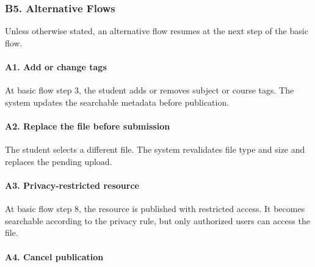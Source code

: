 \documentclass[12pt]{article}
\begin{document}
\hypertarget{sec:b5-alternative-flows}{}
\subsubsection*{B5. Alternative Flows}
\par\medskip

Unless otherwise stated, an alternative flow resumes at the next step of the basic flow.
\par\medskip

\hypertarget{sec:a1-add-or-change-tags}{}
\paragraph*{A1. Add or change tags}
\par\medskip

At basic flow step 3, the student adds or removes subject or course tags. The system updates the searchable metadata before publication.
\par\medskip

\hypertarget{sec:a2-replace-the-file-before-submission}{}
\paragraph*{A2. Replace the file before submission}
\par\medskip

The student selects a different file. The system revalidates file type and size and replaces the pending upload.
\par\medskip

\hypertarget{sec:a3-privacy-restricted-resource}{}
\paragraph*{A3. Privacy-restricted resource}
\par\medskip

At basic flow step 8, the resource is published with restricted access. It becomes searchable according to the privacy rule, but only authorized users can access the file.
\par\medskip

\hypertarget{sec:a4-cancel-publication}{}
\paragraph*{A4. Cancel publication}
\par\medskip
\end{document}
